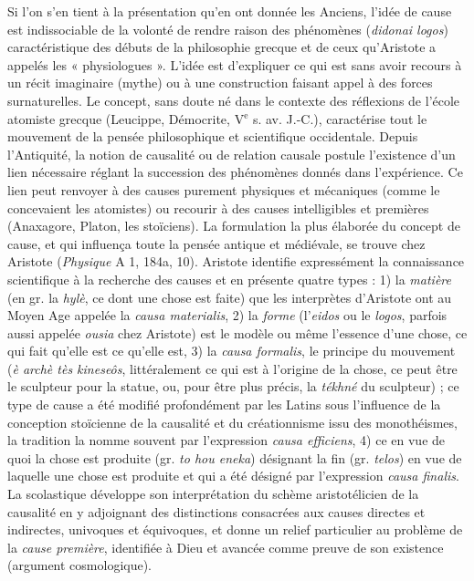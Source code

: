 Si l’on s’en tient à la présentation qu’en
ont donnée les Anciens, l’idée de cause est
indissociable de la volonté de rendre raison des phénomènes ({\it didonai logos}) caractéristique des débuts de la philosophie
grecque et de ceux qu’Aristote a appelés
les « physiologues ». L'idée est d'expliquer
ce qui est sans avoir recours à un récit imaginaire (mythe) ou à une construction faisant appel à des forces surnaturelles. Le
concept, sans doute né dans le contexte des
réflexions de l’école atomiste grecque
(Leucippe, Démocrite, {\footnotesize V}$^\text{e}$ s. av. J.-C.),
caractérise tout le mouvement de la pensée
philosophique et scientifique occidentale.
Depuis l’Antiquité, la notion de causalité
ou de relation causale postule l’existence
d’un lien nécessaire réglant la succession
des phénomènes donnés dans l’expérience. Ce lien peut renvoyer à des causes
purement physiques et mécaniques
(comme le concevaient les atomistes) ou
recourir à des causes intelligibles et premières (Anaxagore, Platon, les stoïciens).
La formulation la plus élaborée du concept
de cause, et qui influença toute la pensée
antique et médiévale, se trouve chez Aristote ({\it Physique} A 1, 184a, 10). Aristote
identifie expressément la connaissance
scientifique à la recherche des causes et en
présente quatre types : 1) la {\it matière} (en gr.
la {\it hylè}, ce dont une chose est faite) que les
interprètes d’Aristote ont au Moyen Age
appelée la {\it causa materialis}, 2) la {\it forme}
(l’{\it eidos} ou le {\it logos}, parfois aussi appelée
{\it ousia} chez Aristote) est le modèle ou
même l'essence d’une chose, ce qui fait
qu’elle est ce qu’elle est, 3) la {\it causa formalis}, le principe du mouvement
({\it è archè tès kineseôs}, littéralement ce qui est à l’origine
de la chose, ce peut être le sculpteur pour
la statue, ou, pour être plus précis, la
{\it tékhné} du sculpteur) ; ce type de cause a
été modifié profondément par les Latins
sous l'influence de la conception stoïcienne
de la causalité et du créationnisme
issu des monothéismes, la tradition la
nomme souvent par l'expression {\it causa efficiens}, 4) ce en vue de quoi la chose
est produite (gr. {\it to hou eneka}) désignant la fin (gr.
{\it telos}) en vue de laquelle une chose est produite et qui a été désigné par l’expression
{\it causa finalis}. La scolastique développe son
interprétation du schème aristotélicien de
la causalité en y adjoignant des distinctions
consacrées aux causes directes et indirectes, univoques et équivoques, et donne
un relief particulier au problème de la
{\it cause première}, identifiée à Dieu et avancée comme preuve de son existence
(argument cosmologique).

